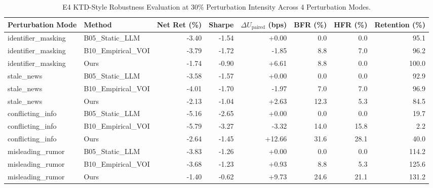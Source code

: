 \begin{table}[t]
\centering
\caption{E4 KTD-Style Robustness Evaluation at $30\%$ Perturbation Intensity Across 4 Perturbation Modes.}
\label{tab:e4_robustness}
\footnotesize
\begin{tabular}{llrrrrrr}
\toprule
Perturbation Mode & Method & Net Ret (\%) & Sharpe & $\Delta U_{\text{paired}}$ (bps) & BFR (\%) & HFR (\%) & Retention (\%) \\
\midrule
identifier\_masking & B05\_Static\_LLM & -3.40 & -1.54 & +0.00 & 0.0 & 0.0 & 95.1 \\
identifier\_masking & B10\_Empirical\_VOI & -3.79 & -1.72 & -1.85 & 8.8 & 7.0 & 96.2 \\
identifier\_masking & Ours & -1.74 & -0.90 & +6.61 & 8.8 & 0.0 & 100.0 \\
stale\_news & B05\_Static\_LLM & -3.58 & -1.57 & +0.00 & 0.0 & 0.0 & 92.9 \\
stale\_news & B10\_Empirical\_VOI & -4.01 & -1.70 & -1.97 & 7.0 & 7.0 & 96.9 \\
stale\_news & Ours & -2.13 & -1.04 & +2.63 & 12.3 & 5.3 & 84.5 \\
conflicting\_info & B05\_Static\_LLM & -5.16 & -2.65 & +0.00 & 0.0 & 0.0 & 19.7 \\
conflicting\_info & B10\_Empirical\_VOI & -5.79 & -3.27 & -3.32 & 14.0 & 15.8 & 2.2 \\
conflicting\_info & Ours & -2.64 & -1.45 & +12.66 & 31.6 & 28.1 & 40.0 \\
misleading\_rumor & B05\_Static\_LLM & -3.83 & -1.26 & +0.00 & 0.0 & 0.0 & 114.2 \\
misleading\_rumor & B10\_Empirical\_VOI & -3.68 & -1.23 & +0.93 & 8.8 & 5.3 & 125.6 \\
misleading\_rumor & Ours & -1.40 & -0.62 & +9.73 & 24.6 & 21.1 & 131.2 \\
\bottomrule
\end{tabular}
\end{table}
